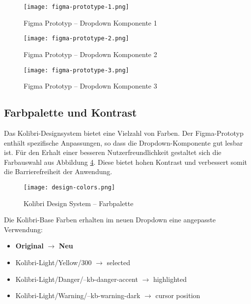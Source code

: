 \begin{figure}[!htb]
    \centering
    \texttt{[image: figma-prototype-1.png]}
    \caption{Figma Prototyp – Dropdown Komponente 1}
    \label{img:figmaPrototype1}
\end{figure}

\begin{figure}[!htb]
    \centering
    \texttt{[image: figma-prototype-2.png]}
    \caption{Figma Prototyp – Dropdown Komponente 2}
    \label{img:figmaPrototype2}
\end{figure}

\begin{figure}[!htb]
    \centering
    \texttt{[image: figma-prototype-3.png]}
    \caption{Figma Prototyp – Dropdown Komponente 3}
    \label{img:figmaPrototype3}
\end{figure}


\subsection{Farbpalette und Kontrast}
\label{sec:colorContrast}

Das Kolibri-Designsystem bietet eine Vielzahl von Farben.
Der Figma-Prototyp enthält spezifische Anpassungen, so dass die Dropdown-Komponente gut lesbar ist.
Für den Erhalt einer besseren Nutzerfreundlichkeit gestaltet sich die Farbauswahl aus Abbildung \ref{img:designColors}.
Diese bietet hohen Kontrast und verbessert somit die Barrierefreiheit der Anwendung.

\begin{figure}[!htb]
    \centering
    \texttt{[image: design-colors.png]}
    \caption{Kolibri Design System – Farbpalette}
    \label{img:designColors}
\end{figure}

\noindent
Die Kolibri-Base Farben erhalten im neuen Dropdown eine angepasste Verwendung:

\begin{itemize}
    \item \textbf{Original} $\rightarrow$ \textbf{Neu}
    \item Kolibri-Light/Yellow/300 $\rightarrow$ selected
    \item Kolibri-Light/Danger/--kb-danger-accent $\rightarrow$ highlighted
    \item Kolibri-Light/Warning/--kb-warning-dark $\rightarrow$ cursor position
\end{itemize}


